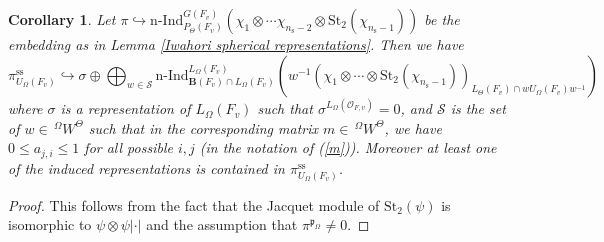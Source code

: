 \documentclass[12pt,oneside,reqno]{amsart}
\theoremstyle{plain}
\newtheorem{corollary}[theorem]{Corollary}
\begin{document}
	\begin{corollary}\label{semi-simplification of pi}
		Let
		$\pi
		\hookrightarrow
		\mathrm{n}
		\text{-}
		\mathrm{Ind}_{P_\Theta(F_v)}^{ G(F_v)}
		(
		\chi_1
		\otimes
		\cdots
		\chi_{n_{\mathrm{s}}-2}
		\otimes
		\mathrm{St}_2(\chi_{n_{\mathrm{s}}-1})
		)$
		be the embedding as in Lemma \ref{Iwahori spherical representations}.
		Then we have
		\[
		\pi_{U_\Omega(F_v)}^\mathrm{ss}
		\hookrightarrow
		\sigma
		\oplus
		\bigoplus_{w\in\mathcal{S}}
		\mathrm{n}
		\text{-}
		\mathrm{Ind}_{\mathbf{B}(F_v)\cap L_\Omega(F_v)}^{L_\Omega(F_v)}
		\left(
		w^{-1}
		(
		\chi_1
		\otimes
		\cdots
		\otimes
		\mathrm{St}_2(\chi_{n_{\mathrm{s}}-1})
		)_{L_\Theta(F_v)\cap wU_\Omega(F_v)w^{-1}}
		\right)
		\]
		where
		$\sigma$ is a representation of
		$L_\Omega(F_v)$
		such that
		$\sigma^{L_\Omega(\mathcal{O}_{F,v})}=0$,
		and
		$\mathcal{S}$
		is the set of
		$w\in\,^\Omega W^\Theta$
		such that in the corresponding matrix
		$m\in\,^\Omega W^\Theta$,
		we have
		$0\le a_{j,i}\le1$
		for all possible $i,j$
		(in the notation of (\ref{m})).
		Moreover
		at least one of the induced representations is contained in
		$\pi_{U_{\Omega}(F_v)}^{\mathrm{ss}}$.
	\end{corollary}
	\begin{proof}
		This follows from the fact that the Jacquet module of
		$\mathrm{St}_2(\psi)$
		is isomorphic to
		$\psi\otimes\psi|\cdot|$
		and the assumption that
		$\pi^{\mathfrak{p}_{\Omega}}
		\ne0$.
	\end{proof}
	
	
	
	
	
\end{document}
